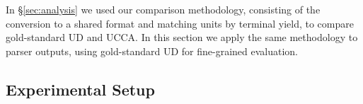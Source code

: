 \documentclass[11pt,a4paper]{article}
\begin{document}
In \S\ref{sec:analysis} we used our comparison methodology,
consisting of the conversion to a shared format and matching units by terminal yield,
to compare gold-standard UD and UCCA.
In this section we apply the same methodology to parser outputs,
using gold-standard UD for fine-grained evaluation.

\subsection{Experimental Setup}\label{sec:experiments}

\end{document}
